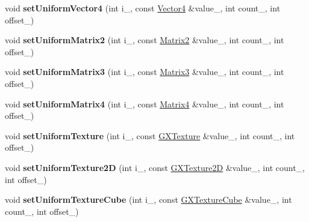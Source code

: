 \begin{DoxyCompactItemize}
\item 
void {\bfseries set\+Uniform\+Vector4} (int i\+\_\+, const \hyperlink{class_i_dream_sky_1_1_vector4}{Vector4} \&value\+\_\+, int count\+\_, int offset\+\_)\hypertarget{class_magnum_1_1_g_x_shader_program2_aad9ba2cfc18eb0a6b374a488195b23ee}{}\label{class_magnum_1_1_g_x_shader_program2_aad9ba2cfc18eb0a6b374a488195b23ee}

\item 
void {\bfseries set\+Uniform\+Matrix2} (int i\+\_\+, const \hyperlink{class_i_dream_sky_1_1_matrix2}{Matrix2} \&value\+\_\+, int count\+\_, int offset\+\_)\hypertarget{class_magnum_1_1_g_x_shader_program2_a8d3cffc27f24b3a76d276c7dba4931b1}{}\label{class_magnum_1_1_g_x_shader_program2_a8d3cffc27f24b3a76d276c7dba4931b1}

\item 
void {\bfseries set\+Uniform\+Matrix3} (int i\+\_\+, const \hyperlink{class_i_dream_sky_1_1_matrix3}{Matrix3} \&value\+\_\+, int count\+\_, int offset\+\_)\hypertarget{class_magnum_1_1_g_x_shader_program2_a352da7f268526f1a3a5ba89719acf802}{}\label{class_magnum_1_1_g_x_shader_program2_a352da7f268526f1a3a5ba89719acf802}

\item 
void {\bfseries set\+Uniform\+Matrix4} (int i\+\_\+, const \hyperlink{class_i_dream_sky_1_1_matrix4}{Matrix4} \&value\+\_\+, int count\+\_, int offset\+\_)\hypertarget{class_magnum_1_1_g_x_shader_program2_a0d32400cfb4e1ff6cc96a474ee71db1e}{}\label{class_magnum_1_1_g_x_shader_program2_a0d32400cfb4e1ff6cc96a474ee71db1e}

\item 
void {\bfseries set\+Uniform\+Texture} (int i\+\_\+, const \hyperlink{class_i_dream_sky_1_1_g_x_texture}{G\+X\+Texture} \&value\+\_\+, int count\+\_, int offset\+\_)\hypertarget{class_magnum_1_1_g_x_shader_program2_a2af4503e338c98ec3161f61ed373ac22}{}\label{class_magnum_1_1_g_x_shader_program2_a2af4503e338c98ec3161f61ed373ac22}

\item 
void {\bfseries set\+Uniform\+Texture2D} (int i\+\_\+, const \hyperlink{class_i_dream_sky_1_1_g_x_texture2_d}{G\+X\+Texture2D} \&value\+\_\+, int count\+\_, int offset\+\_)\hypertarget{class_magnum_1_1_g_x_shader_program2_a186182f6e5d3d1b3eb6bb89fa6d7b564}{}\label{class_magnum_1_1_g_x_shader_program2_a186182f6e5d3d1b3eb6bb89fa6d7b564}

\item 
void {\bfseries set\+Uniform\+Texture\+Cube} (int i\+\_\+, const \hyperlink{class_i_dream_sky_1_1_g_x_texture_cube}{G\+X\+Texture\+Cube} \&value\+\_\+, int count\+\_, int offset\+\_)\hypertarget{class_magnum_1_1_g_x_shader_program2_a6eb6e0e6f8a8d7f8e12fcb575e3cb1c1}{}\label{class_magnum_1_1_g_x_shader_program2_a6eb6e0e6f8a8d7f8e12fcb575e3cb1c1}


\end{DoxyCompactItemize}
